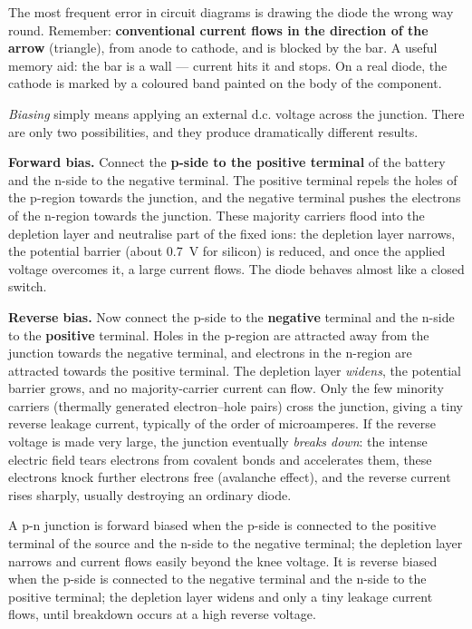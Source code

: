 \documentclass[11pt]{article}
\newcommand{\cle}[1]{{\popxbold\color{popdark}#1}}
\newcounter{popsec}
\newcounter{popsub}
\newcommand{\courssub}[1]{%
  \stepcounter{popsub}%
  \par\vspace{9pt}\noindent{\popxbold\fontsize{11.5}{13}\selectfont\color{popink}{\color{poporange}\thepopsec.\thepopsub}\hspace{6pt}#1}\par\nopagebreak\vspace{4pt}
}
\begin{document}
\begin{attention}
The most frequent error in circuit diagrams is drawing the diode the wrong way round. Remember: \textbf{conventional current flows in the direction of the arrow} (triangle), from anode to cathode, and is blocked by the bar. A useful memory aid: the bar is a wall --- current hits it and stops. On a real diode, the cathode is marked by a coloured band painted on the body of the component.
\end{attention}

\courssub{Biasing the Junction: Forward and Reverse}

\emph{Biasing} simply means applying an external d.c. voltage across the junction. There are only two possibilities, and they produce dramatically different results.

\textbf{Forward bias.} Connect the \textbf{p-side to the positive terminal} of the battery and the n-side to the negative terminal. The positive terminal repels the holes of the p-region towards the junction, and the negative terminal pushes the electrons of the n-region towards the junction. These majority carriers flood into the depletion layer and neutralise part of the fixed ions: the \cle{depletion layer narrows}, the potential barrier (about \SI{0.7}{V} for silicon) is reduced, and once the applied voltage overcomes it, a large current flows. The diode behaves almost like a closed switch.

\textbf{Reverse bias.} Now connect the p-side to the \textbf{negative} terminal and the n-side to the \textbf{positive} terminal. Holes in the p-region are attracted away from the junction towards the negative terminal, and electrons in the n-region are attracted towards the positive terminal. The depletion layer \emph{widens}, the potential barrier grows, and no majority-carrier current can flow. Only the few minority carriers (thermally generated electron--hole pairs) cross the junction, giving a tiny \cle{reverse leakage current}, typically of the order of microamperes. If the reverse voltage is made very large, the junction eventually \emph{breaks down}: the intense electric field tears electrons from covalent bonds and accelerates them, these electrons knock further electrons free (avalanche effect), and the reverse current rises sharply, usually destroying an ordinary diode.

\begin{definition}
A p-n junction is \cle{forward biased} when the p-side is connected to the positive terminal of the source and the n-side to the negative terminal; the depletion layer narrows and current flows easily beyond the knee voltage. It is \cle{reverse biased} when the p-side is connected to the negative terminal and the n-side to the positive terminal; the depletion layer widens and only a tiny leakage current flows, until breakdown occurs at a high reverse voltage.
\end{definition}
\end{document}
